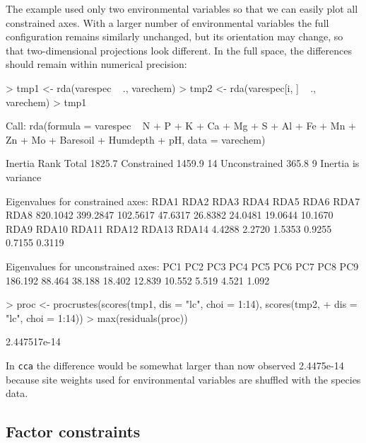 \documentclass[a4paper,10pt]{amsart}
\begin{document}
The example used only two environmental variables so that we can
easily plot all constrained axes.  With a larger number of
environmental variables the full configuration remains similarly
unchanged, but its orientation may change, so that two-dimensional
projections look different.  In the full space, the differences should
remain within numerical precision:
\begin{Schunk}
\begin{Sinput}
> tmp1 <- rda(varespec ~ ., varechem)
> tmp2 <- rda(varespec[i, ] ~ ., varechem)
> tmp1
\end{Sinput}
\begin{Soutput}
Call: rda(formula = varespec ~ N + P + K + Ca + Mg + S + Al + Fe + Mn +
Zn + Mo + Baresoil + Humdepth + pH, data = varechem)

              Inertia Rank
Total          1825.7     
Constrained    1459.9   14
Unconstrained   365.8    9
Inertia is variance 

Eigenvalues for constrained axes:
    RDA1     RDA2     RDA3     RDA4     RDA5     RDA6     RDA7     RDA8 
820.1042 399.2847 102.5617  47.6317  26.8382  24.0481  19.0644  10.1670 
    RDA9    RDA10    RDA11    RDA12    RDA13    RDA14 
  4.4288   2.2720   1.5353   0.9255   0.7155   0.3119 

Eigenvalues for unconstrained axes:
    PC1     PC2     PC3     PC4     PC5     PC6     PC7     PC8     PC9 
186.192  88.464  38.188  18.402  12.839  10.552   5.519   4.521   1.092 
\end{Soutput}
\begin{Sinput}
> proc <- procrustes(scores(tmp1, dis = "lc", choi = 1:14), scores(tmp2, 
+     dis = "lc", choi = 1:14))
> max(residuals(proc))
\end{Sinput}
\begin{Soutput}
[1] 2.447517e-14
\end{Soutput}
\end{Schunk}
In \texttt{cca} the difference would be somewhat larger than now
observed 2.4475e-14 because site
weights used for environmental variables are shuffled with the species
data.

\subsection{Factor constraints}
\end{document}
